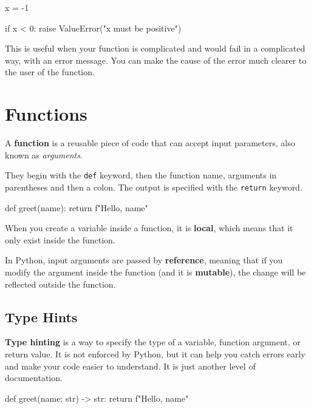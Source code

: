 \begin{codeblock}[language=python]
x = -1

if x < 0:
    raise ValueError("x must be positive")
\end{codeblock}

This is useful when your function is complicated and would fail in a complicated way, with an error message. You can make the cause of the error much clearer to the user of the function. 


\section{Functions}

\begin{definitionblock}[Function]
    A \textbf{function} is a reusable piece of code that can accept input parameters, also known as \textit{arguments}. 
\end{definitionblock}

They begin with the \texttt{def} keyword, then the function name, arguments in parentheses and then a colon. The output is specified with the \texttt{return} keyword. 

\begin{codeblock}[language=python]
def greet(name):
    return f"Hello, {name}"
\end{codeblock}

When you create a variable inside a function, it is \textbf{local}, which means that it only exist inside the function. 

\begin{warningblock}
    In Python, input arguments are passed by \textbf{reference}, meaning that if you modify the argument inside the function (and it is \textbf{mutable}), the change will be reflected outside the function.
\end{warningblock}

\subsection*{Type Hints}

\textbf{Type hinting} is a way to specify the type of a variable, function argument, or return value. It is not enforced by Python, but it can help you catch errors early and make your code easier to understand. It is just another level of documentation. 

\begin{codeblock}[language=python]
def greet(name: str) -> str:
    return f"Hello, {name}"
\end{codeblock}

